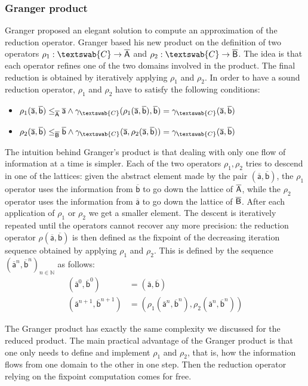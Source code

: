 \documentclass[submission,copyright,creativecommons]{eptcs}
\newcommand{\naturals}{\ensuremath{\mathbb{N}}}
\newcommand{\funzione}[2]{\ensuremath{#1 \rightarrow#2}}
\newcommand{\cel}[1]{\ensuremath{\mathsf{#1}}}
\newcommand{\ael}[1]{\cel{\overline{#1}}}
\newcommand{\firstdomain}{\aset{A}}
\newcommand{\seconddomain}{\aset{B}}
\newcommand{\cartesiandomain}{\textswab{C}}
\begin{document}
\subsubsection{Granger product}
Granger \cite{G92} proposed an elegant solution to compute an approximation of the reduction operator. Granger based his new product on the definition of two operators $\rho_1 : \funzione{\cartesiandomain}{\firstdomain}$ and $\rho_2 : \funzione{\cartesiandomain}{\seconddomain}$. The idea is that each operator refines one of the two domains involved in the product. The final reduction is obtained by iteratively applying $\rho_1$ and $\rho_2$. In order to have a sound reduction operator, $\rho_1$ and $\rho_2$ have to satisfy the following conditions:
\begin{itemize}
\item $\rho_1(\ael{a}, \ael{b}) \leq_\firstdomain \ael{a} \wedge \gamma_\cartesiandomain(\rho_1(\ael{a}, \ael{b}), \ael{b}) = \gamma_\cartesiandomain(\ael{a},\ael{b})$
\item 
$\rho_2(\ael{a}, \ael{b}) \leq_\seconddomain \ael{b} \wedge \gamma_\cartesiandomain(\ael{a}, \rho_2(\ael{a}, \ael{b})) = \gamma_\cartesiandomain(\ael{a},\ael{b})$
\end{itemize}
The intuition behind Granger's product is that dealing with only one flow of information at a time is simpler. Each of the two operators $\rho_1, \rho_2$ tries to descend in one of the lattices: given the abstract element made by the pair $(\ael{a}, \ael{b})$, the $\rho_1$ operator uses the information from $\ael{b}$ to go down the lattice of 	$\firstdomain$, while the $\rho_2$ operator uses the information from $\ael{a}$ to go down the lattice of $\seconddomain$. After each application of $\rho_1$ or $\rho_2$ we get a smaller element. The descent is iteratively repeated until the operators cannot recover any more precision: the reduction operator $\rho(\ael{a}, \ael{b})$ is then defined as the fixpoint of the decreasing iteration sequence obtained by applying $\rho_1$ and $\rho_2$. This is defined by the sequence $(\ael{a}^n,\ael{b}^n)_{n \in \naturals}$ as follows:
\begin{align*}
(\ael{a}^0, \ael{b}^0) & = (\ael{a}, \ael{b}) \\
(\ael{a}^{n+1}, \ael{b}^{n+1}) & = (\rho_1(\ael{a}^n, \ael{b}^n),\rho_2(\ael{a}^n, \ael{b}^n))
\end{align*}

The Granger product has exactly the same complexity we discussed for the reduced product. The main practical advantage of the Granger product is that one only needs to define and implement $\rho_1$ and $\rho_2$, that is, how the information flows from one domain to the other in one step. Then the reduction operator relying on the fixpoint computation comes for free. 
\end{document}
